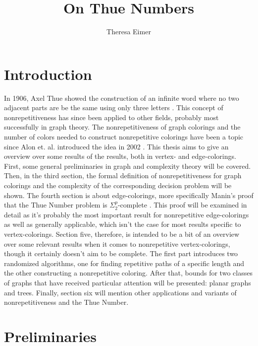 \documentclass[12pt,a4paper]{article}
\author{Theresa Eimer}
\title{On Thue Numbers}
\date{}
\begin{document}
\renewcommand{\figurename}{Fig.}
\maketitle
\thispagestyle{empty}
\newpage
\tableofcontents
\thispagestyle{empty}
\newpage

\section{Introduction}
In 1906, Axel Thue showed the construction of an infinite word where no two adjacent parts are be the same using only three letters \citep{Thue1906}. This concept of nonrepetitiveness has since been applied to other fields, probably most successfully in graph theory. The nonrepetitiveness of graph colorings and the number of colors needed to construct nonrepetitive colorings have been a topic since Alon et. al. introduced the idea in 2002 \citep{Alon2002}. This thesis aims to give an overview over some results of the results, both in vertex- and edge-colorings. 
\newline
First, some general preliminaries in graph and complexity theory will be covered. 
\newline
Then, in the third section, the formal definition of nonrepetitiveness for graph colorings and the complexity of the corresponding decision problem will be shown. 
\newline
The fourth section is about edge-colorings, more specifically Manin's proof that the Thue Number problem is $\Sigma^p_2$-complete \citep{Manin2008}. This proof will be examined in detail as it's probably the most important result for nonrepetitive edge-colorings as well as generally applicable, which isn't the case for most results specific to vertex-colorings.
\newline
Section five, therefore, is intended to be a bit of an overview over some relevant results when it comes to nonrepetitive vertex-colorings, though it certainly doesn't aim to be complete. The first part introduces two randomized algorithms, one for finding repetitive paths of a specific length and the other constructing a nonrepetitive coloring. After that, bounds for two classes of graphs that have received particular attention will be presented: planar graphs and trees. 
\newline
Finally, section six will mention other applications and variants of nonrepetitiveness and the Thue Number.
\newpage
\section{Preliminaries}
\end{document}
